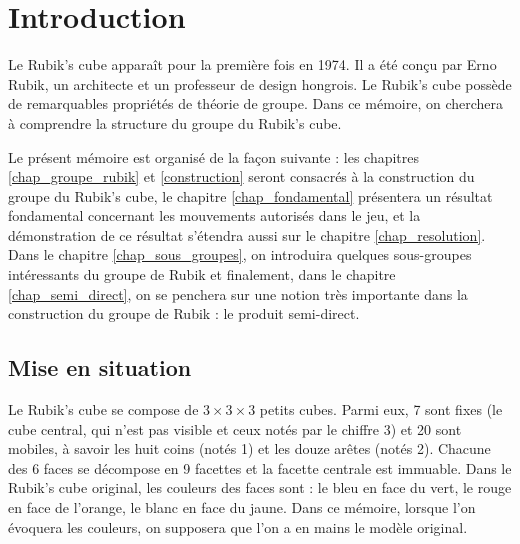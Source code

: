 \documentclass[french]{report}
\begin{document}
\tableofcontents

\newpage

\chapter*{Introduction}

Le Rubik's cube apparaît pour la première fois en 1974. Il a été conçu par Erno Rubik, un architecte et un professeur de design hongrois. Le Rubik's cube possède de remarquables propriétés de théorie de groupe. Dans ce mémoire, on cherchera à comprendre la structure du groupe du Rubik's cube.

Le présent mémoire est organisé de la façon suivante : les chapitres \ref{chap_groupe_rubik} et \ref{construction} seront consacrés à la construction du groupe du Rubik's cube, le chapitre \ref{chap_fondamental} présentera un résultat fondamental concernant les mouvements autorisés dans le jeu, et la démonstration de ce résultat s'étendra aussi sur le chapitre \ref{chap_resolution}. Dans le chapitre \ref{chap_sous_groupes}, on introduira quelques sous-groupes intéressants du groupe de Rubik et finalement, dans le chapitre \ref{chap_semi_direct}, on se penchera sur une notion très importante dans la construction du groupe de Rubik : le produit semi-direct.

\section*{Mise en situation}

Le Rubik's cube se compose de $3 \times 3 \times 3$ petits cubes. Parmi eux, 7 sont fixes (le cube central, qui n'est pas visible et ceux notés par le chiffre 3) et 20 sont mobiles, à savoir les huit coins (notés 1) et les douze arêtes (notés 2). Chacune des 6 faces se décompose en 9 facettes et la facette centrale est immuable. Dans le Rubik's cube original, les couleurs des faces sont : le bleu en face du vert, le rouge en face de l'orange, le blanc en face du jaune. Dans ce mémoire, lorsque l'on évoquera les couleurs, on supposera que l'on a en mains le modèle original.
\end{document}
